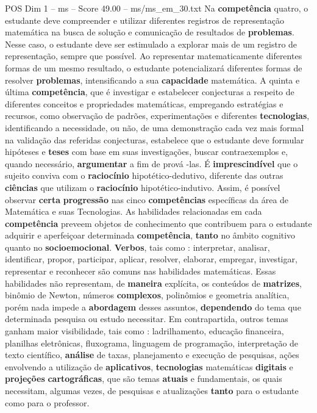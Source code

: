 \begin{textsample}{POS Dim 1 – ms – Score 49.00 – ms/ms\_em\_30.txt}
Na \textbf{competência} quatro, o estudante deve compreender e utilizar diferentes registros de representação matemática na busca de solução e comunicação de resultados de \textbf{problemas}.
Nesse caso, o estudante deve ser estimulado a explorar mais de um registro de representação, sempre que possível.
Ao representar matematicamente diferentes formas de um mesmo resultado, o estudante potencializará diferentes formas de resolver \textbf{problemas}, intensificando a sua \textbf{capacidade} matemática.
A quinta e última \textbf{competência}, que é investigar e estabelecer conjecturas a respeito de diferentes conceitos e propriedades matemáticas, empregando estratégias e recursos, como observação de padrões, experimentações e diferentes \textbf{tecnologias}, identificando a necessidade, ou não, de uma demonstração cada vez mais formal na validação das referidas conjecturas, estabelece que o estudante deve formular hipóteses e \textbf{teses} com base em suas investigações, buscar contraexemplos e, quando necessário, \textbf{argumentar} a fim de prová -las.
É \textbf{imprescindível} que o sujeito conviva com o \textbf{raciocínio} hipotético-dedutivo, diferente das outras \textbf{ciências} que utilizam o \textbf{raciocínio} hipotético-indutivo.
Assim, é possível observar \textbf{certa} \textbf{progressão} nas cinco \textbf{competências} específicas da área de Matemática e suas Tecnologias.
As habilidades relacionadas em cada \textbf{competência} preveem objetos de conhecimento que contribuem para o estudante adquirir e aperfeiçoar determinada \textbf{competência}, \textbf{tanto} no âmbito cognitivo quanto no \textbf{socioemocional}. \textbf{Verbos}, tais como : interpretar, analisar, identificar, propor, participar, aplicar, resolver, elaborar, empregar, investigar, representar e reconhecer são comuns nas habilidades matemáticas.
Essas habilidades não representam, de \textbf{maneira} explícita, os conteúdos de \textbf{matrizes}, binômio de Newton, números \textbf{complexos}, polinômios e geometria analítica, porém nada impede a \textbf{abordagem} desses assuntos, \textbf{dependendo} do tema que determinada pesquisa ou estudo necessitar.
Em contrapartida, outros temas ganham maior visibilidade, tais como : ladrilhamento, educação financeira, planilhas eletrônicas, fluxograma, linguagem de programação, interpretação de texto científico, \textbf{análise} de taxas, planejamento e execução de pesquisas, ações envolvendo a utilização de \textbf{aplicativos}, \textbf{tecnologias} matemáticas \textbf{digitais} e \textbf{projeções} \textbf{cartográficas}, que são temas \textbf{atuais} e fundamentais, os quais necessitam, algumas vezes, de pesquisas e atualizações \textbf{tanto} para o estudante como para o professor.

\end{textsample}
